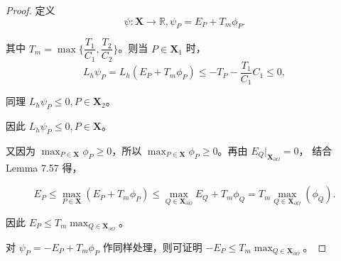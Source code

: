 \documentclass[lang=cn,a4paper,newtx,bibend=bibtex]{elegantpaper}
\newcommand{\XB}{\bm{X}}
\newcommand{\RBB}{\mathbb{R}}
\begin{document}
\begin{proof}
定义
\[\psi : \XB \to \RBB, \psi_P = E_P + T_m \phi_P.\]

其中 $T_m = \max\{\dfrac{T_1}{C_1}, \dfrac{T_2}{C_2}\}$。则当 $P \in \XB_1$ 时，
\[L_h \psi_P = L_h(E_P + T_m\phi_P) \le - T_P - \dfrac{T_1}{C_1} C_1 \le 0,\]
 
同理 $L_h \psi_P \le 0, P \in \XB_2$。

因此 $L_h\psi_P \le 0, P \in \XB$。

又因为 $\max_{P\in \XB} \phi_P \ge 0$，所以 $\max_{P\in \XB} \phi_P \ge 0$。再由 $E_Q \big|_{\XB_{\partial \Omega}} =0 $，
结合 Lemma 7.57 得，

\[E_P \le \max_{P\in\XB} (E_P + T_m \phi_P) \le \max_{Q\in \XB_{\partial \Omega}} E_Q + T_m \phi_Q = T_m \max_{Q\in \XB_{\partial \Omega}} (\phi_Q).\]

因此 $E_P \le T_m \max_{Q\in \XB_{\partial \Omega}}。$

对 $\psi_P = -E_P + T_m \phi_P$ 作同样处理，则可证明 $-E_P \le T_m \max_{Q\in \XB_{\partial \Omega}}$。
\end{proof}

\nocite{*}
\printbibliography[heading=bibintoc, title=\ebibname]
\end{document}
